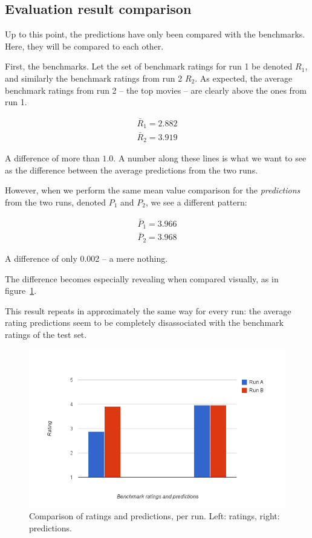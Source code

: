 \subsection{Evaluation result comparison} %
\label{sub:evaluation_result_comparison}

Up to this point, the predictions have only been compared with the benchmarks. Here, they will be compared to each other.

First, the benchmarks. Let the set of benchmark ratings for run 1 be denoted $R_1$, and similarly the benchmark ratings from run 2 $R_2$. As expected, the average benchmark ratings from run 2 -- the top movies -- are clearly above the ones from run 1.

\begin{align}
  \bar{R}_1 = 2.882 \\
  \bar{R}_2 = 3.919
\end{align}

A difference of more than $1.0$. A number along these lines is what we want to see as the difference between the average predictions from the two runs.

However, when we perform the same mean value comparison for the \emph{predictions} from the two runs, denoted $P_1$ and $P_2$, we see a different pattern:

\begin{align}
  \bar{P}_1 = 3.966 \\
  \bar{P}_2 = 3.968
\end{align}

A difference of only 0.002 -- a mere nothing.

The difference becomes especially revealing when compared visually, as in figure~\ref{fig:pr_run_comparison}.

This result repeats in approximately the same way for every run: the average rating predictions seem to be completely disassociated with the benchmark ratings of the test set.

\begin{figure}[h]
  \centering
    \includegraphics[width=.8\textwidth]{Figures/plots/pr_run_comparison}
  \caption{Comparison of ratings and predictions, per run. Left: ratings, right: predictions.}
  \label{fig:pr_run_comparison}
\end{figure}

